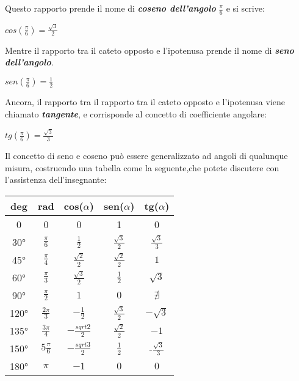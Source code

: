 Questo rapporto prende il nome di {\bf \slshape coseno dell'angolo} $\frac \pi 6$ e si scrive:
\begin{center}
\begin{math}
cos(\frac \pi 6) = \frac {\sqrt 3} 2
\end{math}
\end{center}
Mentre il rapporto tra il cateto opposto e l'ipotenusa prende il nome di {\bfseries \slshape seno dell'angolo}.
\begin{center}
\begin{math}
sen(\frac \pi 6) = \frac 1 2
\end{math}
\end{center}
Ancora, il rapporto tra il rapporto tra il cateto opposto e l'ipotenusa viene chiamato {\bf \slshape tangente}, e corrisponde al concetto di coefficiente angolare:
\begin{center}
\begin{math}
tg(\frac \pi 6) = \frac {\sqrt 3} 3
\end{math}
\end{center}
Il concetto di seno e coseno può essere generalizzato ad angoli di qualunque misura, costruendo una tabella come la seguente,che potete discutere con l'assistenza dell'insegnante:\newline
\begin{center}
\begin{tabular}{|c|c|c|c|c|}
\hline
deg & rad & cos($\alpha$) & sen($\alpha$) & tg($\alpha$) \\
\hline
0 & 0 & 0 & 1 & 0 \\
\hline
30° & $\frac \pi 6$ & $\frac 1 2$ & $\frac {\sqrt 3} 2$ & $\frac {\sqrt 3} 3$ \\
\hline
45° & $\frac \pi 4$ & $\frac {\sqrt 2} 2$ & $\frac {\sqrt 2} 2$ & $1$ \\
\hline
60° & $\frac \pi 3$ & $\frac {\sqrt 3} 2$ & $\frac 1 2$ & $\sqrt 3$ \\
\hline
90° & $\frac \pi 2$ & $1$ & $0$ & $\nexists$ \\
\hline
120° & $\frac {2 \pi} 3$ & $-\frac 1 2$ & $\frac {\sqrt 3} {2}$ & $-\sqrt 3$ \\
\hline
135° & $\frac {3 \pi} 4$ & $-\frac {sqrt 2} 2$ & $\frac {\sqrt 2} {2}$ & $-1$ \\
\hline
150° & $5 \frac \pi 6$ & $-\frac {sqrt 3} 2$ & $\frac 1 2$ & -$\frac {\sqrt 3} {3}$ \\
\hline
180° & $\pi $ & $-1$ & $0$ & $0$ \\
\hline
\end{tabular}
\end{center}

